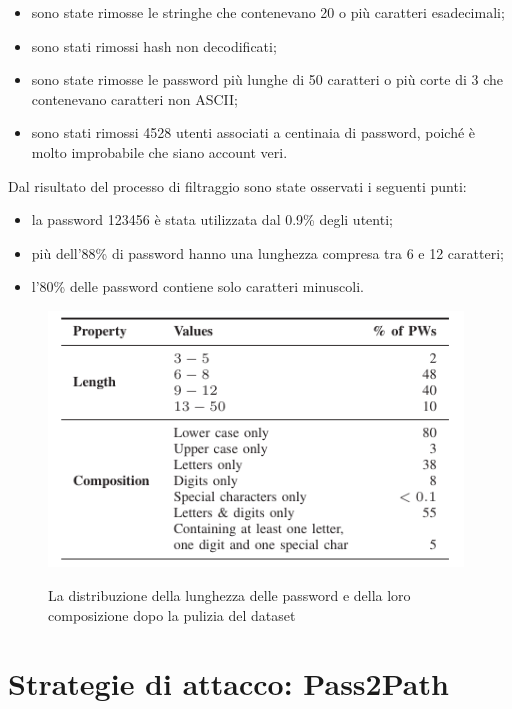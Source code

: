 \begin{itemize}
    \item sono state rimosse le stringhe che contenevano 20 o più caratteri esadecimali;
    \item sono stati rimossi hash non decodificati;
    \item sono state rimosse le password più lunghe di 50 caratteri o più corte di 3 che contenevano caratteri non ASCII;
    \item sono stati rimossi 4528 utenti associati a centinaia di password, poiché è molto improbabile che siano account veri.
\end{itemize}

Dal risultato del processo di filtraggio sono state osservati i seguenti punti:
\begin{itemize}
    \item la password 123456 è stata utilizzata dal 0.9\% degli utenti;
    \item più dell'88\% di password hanno una lunghezza compresa tra 6 e 12 caratteri;
    \item l'80\% delle password contiene solo caratteri minuscoli.
\end{itemize}

\begin{figure}[h]
    \centering
    \includegraphics[width=11cm]{./immagini/pulizia_dataset_biijeta.png}
    \label{pulizia dataset}
    \caption{La distribuzione della lunghezza delle password e della loro composizione dopo la pulizia del dataset~\cite{biijeta}}
\end{figure}



\section{Strategie di attacco: Pass2Path}
\label{sec:pass2path}
